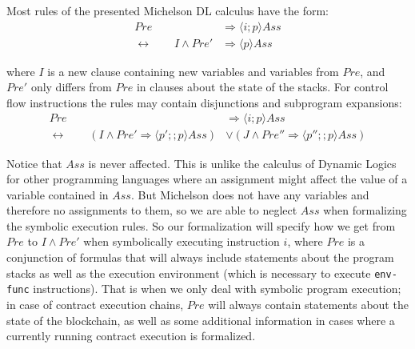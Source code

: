 \begin{comment}
\draft{And when we're perfectly honest (hence this is just a draft ;p),
what we have developed is only a precursor to a full Dynamic Logic
(i'll hopefully find a formulation somewhat like above with
``the main focus \ldots therefore here we only give \ldots'').
We give a calculus for the following parts:}
\end{comment}

Most rules of the presented Michelson DL calculus have the form:
\begin{align*}
			           Pre  &\Longrightarrow \langle i ; p \rangle Ass
\\ \leftrightarrow \qquad I \land  Pre' &\Longrightarrow \langle     p \rangle Ass
\end{align*}

where $I$ is a new clause containing new variables and variables from $Pre$,
and $Pre'$ only differs from $Pre$ in clauses about the state of the stacks.
For control flow instructions the rules may contain disjunctions and subprogram expansions:
\begin{align*}
			           Pre  &\Longrightarrow \langle i    ; p \rangle Ass
\\ \leftrightarrow \qquad (I \land Pre'  \Longrightarrow \langle p'  ;; p \rangle Ass)
		   &\lor  (J \land Pre'' \Longrightarrow \langle p'' ;; p \rangle Ass)
\end{align*}

Notice that $Ass$ is never affected.
This is unlike the calculus of Dynamic Logics for other programming languages 
where an assignment might affect the value of a variable contained in $Ass$.
But Michelson does not have any variables and therefore no assignments to them,
so we are able to neglect $Ass$ when formalizing the symbolic execution rules.
So our formalization will specify how we get from $Pre$ to $I \land Pre'$
when symbolically executing instruction $i$, where $Pre$ is a conjunction of formulas 
that will always include statements about the program stacks
as well as the execution environment (which is necessary to execute \verb/env-func/ instructions).
That is when we only deal with symbolic program execution; in case of contract execution chains,
$Pre$ will always contain statements about the state of the blockchain, as well as some additional
information in cases where a currently running contract execution is formalized.

